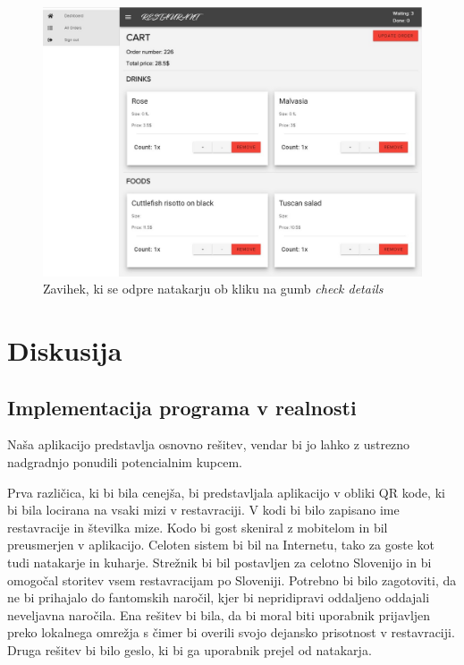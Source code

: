 \documentclass[a4paper, 12pt]{book}
\begin{document}
\begin{figure}[!htb]
\begin{center}
\includegraphics[width=13cm]{natakar_3.jpg}
\caption{Zavihek, ki se odpre natakarju ob kliku na gumb \textit{check details}}
\label{Natakar_3}
\end{center}
\end{figure}
\chapter {Diskusija}

\section{Implementacija programa v realnosti}

Naša aplikacijo predstavlja osnovno rešitev, vendar bi jo lahko z ustrezno nadgradnjo ponudili potencialnim kupcem.

Prva različica, ki bi bila cenejša, bi predstavljala aplikacijo v obliki QR kode, ki bi bila locirana na vsaki mizi v restavraciji. V kodi bi bilo zapisano ime restavracije in številka mize. Kodo bi gost skeniral z mobitelom in bil preusmerjen v aplikacijo. Celoten sistem bi bil na Internetu, tako za goste kot tudi natakarje in kuharje. Strežnik bi bil postavljen za celotno Slovenijo in bi omogočal storitev vsem restavracijam po Sloveniji. Potrebno bi bilo zagotoviti, da ne bi prihajalo do fantomskih naročil, kjer bi nepridipravi oddaljeno oddajali neveljavna naročila. Ena rešitev bi bila, da bi moral biti uporabnik prijavljen preko lokalnega omrežja s čimer bi overili svojo dejansko prisotnost v restavraciji. Druga rešitev bi bilo geslo, ki bi ga uporabnik prejel od natakarja. 
\end{document}
